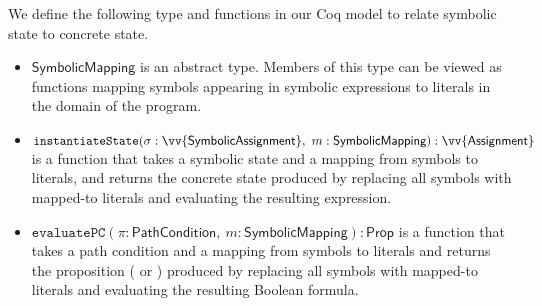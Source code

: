 We define the following type and functions in our Coq model to relate symbolic
state to concrete state. 

\begin{itemize}
\item $\textsf{SymbolicMapping}$ is an abstract type. Members of this type
  can be viewed as functions mapping symbols appearing in symbolic expressions to literals
  in the domain of the program.
\item $\mathtt{instantiateState}(\sigma: \vv{\textsf{SymbolicAssignment}},~
    m: \textsf{SymbolicMapping}) : \vv{\textsf{Assignment}}$ is a function that takes a symbolic state and a mapping from symbols to literals, and
returns the concrete state produced by replacing all symbols with mapped-to
literals and evaluating the resulting expression.
\item $\mathtt{evaluatePC}(\pi : \textsf{PathCondition},~m:
  \textsf{SymbolicMapping}) : \textsf{Prop}$ is a function that takes a path
  condition and a mapping from symbols to literals and returns the proposition
  (\texttrue{} or \textfalse) produced by replacing all symbols with mapped-to
  literals and evaluating the resulting Boolean formula.
\end{itemize}




